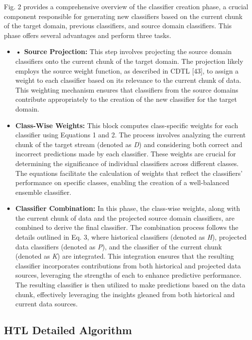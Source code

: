 Fig. 2 provides a comprehensive overview of the classifier creation phase, a crucial component responsible for generating new classifiers based on the current chunk of the target domain, previous classifiers, and source domain classifiers. This phase offers several advantages and perform three tasks. \begin{itemize}
	\item \textbf{•	Source Projection:} This step involves projecting the source domain classifiers onto the current chunk of the target domain. The projection likely employs the source weight function, as described in CDTL [43], to assign a weight to each classifier based on its relevance to the current chunk of data. This weighting mechanism ensures that classifiers from the source domains contribute appropriately to the creation of the new classifier for the target domain.
	\item \textbf{Class-Wise Weights:} This block computes class-specific weights for each classifier using Equations 1 and 2. The process involves analyzing the current chunk of the target stream (denoted as \emph{D}) and considering both correct and incorrect predictions made by each classifier. These weights are crucial for determining the significance of individual classifiers across different classes. The equations facilitate the calculation of weights that reflect the classifiers' performance on specific classes, enabling the creation of a well-balanced ensemble classifier.
	\item \textbf{Classifier Combination:} In this phase, the class-wise weights, along with the current chunk of data and the projected source domain classifiers, are combined to derive the final classifier. The combination process follows the details outlined in Eq. 3, where historical classifiers (denoted as \emph{H}), projected data classifiers (denoted as \emph{P}), and the classifier of the current chunk (denoted as \emph{K}) are integrated. This integration ensures that the resulting classifier incorporates contributions from both historical and projected data sources, leveraging the strengths of each to enhance predictive performance. The resulting classifier is then utilized to make predictions based on the data chunk, effectively leveraging the insights gleaned from both historical and current data sources.
\end{itemize}

\subsection{HTL Detailed Algorithm}

